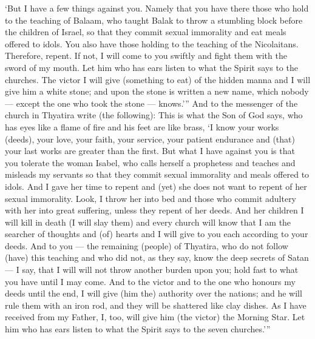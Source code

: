 \begin{pages}
\begin{Leftside}
		\pend
		\pstart
			‘But I have a few things against you. Namely that you have there those who hold to the teaching of Balaam, who taught Balak to throw a stumbling block before the children of Israel, so that they commit sexual immorality and eat meals offered to idols. You also have those holding to the teaching of the Nicolaitans. Therefore, repent. If not, I will come to you swiftly and fight them with the sword of my mouth. Let him who has ears listen to what the Spirit says to the churches. The victor I will give (something to eat) of the hidden manna and I will give him a white stone; and upon the stone is written a new name, which nobody — except the one who took the stone — knows.’”
		\pend
		\pstart
			And to the messenger of the church in Thyatira write (the following): This is what the Son of God says, who has eyes like a flame of fire and his feet are like brass, ‘I know your works (deeds), your love, your faith, your service, your patient endurance and (that) your last works are greater than the first.
		\pend
		\pstart
			But what I have against you is that you tolerate the woman Isabel, who calls herself a prophetess and teaches and misleads my servants so that they commit sexual immorality and meals offered to idols. And I gave her time to repent and (yet) she does not want to repent of her sexual immorality. 
		\pend	
		\pstart
			Look, I throw her into bed and those who commit adultery with her into great suffering, unless they repent of her deeds. And her children I will kill in death (I will slay them) and every church will know that I am the searcher of thoughts and (of) hearts and I will give to you each according to your deeds. And to you — the remaining (people) of Thyatira, who do not follow (have) this teaching and who did not, as they say, know the deep secrets of Satan — I say, that I will will not throw another burden upon you; hold fast to what you have until I may come. And to the victor and to the one who honours my deeds until the end, I will give (him the) authority over the nations; and he will rule them with an iron rod, and they will be shattered like clay dishes. As I have received from my Father, I, too, will give him (the victor) the Morning Star. Let him who has ears listen to what the Spirit says to the seven churches.’”
		\pend
        \endnumbering
    \end{Leftside}

\end{pages} 
\Pages

